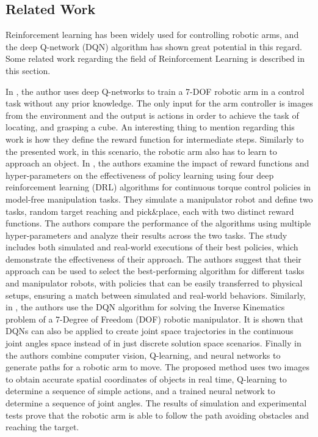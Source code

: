 \documentclass[12pt,oneside]{article}
\begin{document}
%
\subsection{Related Work}
Reinforcement learning has been widely used for controlling robotic arms, and the deep Q-network (DQN) algorithm has shown great potential in this regard. Some related work regarding the field of Reinforcement Learning is described in this section.

In \cite{james20163d}, the author uses deep Q-networks to train a 7-DOF robotic arm in
a control task without any prior knowledge. The only input for the arm controller is images from the environment and the output is actions in order to achieve the task of locating, and grasping a cube. An interesting thing to mention regarding this work is how they define the reward function for intermediate steps. Similarly to the presented work, in this scenario, the robotic arm also has to learn to approach an object. 
In \cite{franceschetti2022robotic}, the authors examine the impact of reward functions and hyper-parameters on the effectiveness of policy learning using four deep reinforcement learning (DRL) algorithms for continuous torque control policies in model-free manipulation tasks. They simulate a manipulator robot and define two tasks, random target reaching and pick\&place, each with two distinct reward functions. The authors compare the performance of the algorithms using multiple hyper-parameters and analyze their results across the two tasks. The study includes both simulated and real-world executions of their best policies, which demonstrate the effectiveness of their approach. The authors suggest that their approach can be used to select the best-performing algorithm for different tasks and manipulator robots, with policies that can be easily transferred to physical setups, ensuring a match between simulated and real-world behaviors.
Similarly,  in \cite{malik2022deep}, the authors use the DQN algorithm for solving the Inverse Kinematics problem of a 7-Degree of Freedom (DOF) robotic manipulator. It is shown that DQNs can also be applied to create joint space trajectories in the continuous joint angles space instead of in just discrete solution space scenarios.
Finally in \cite{abdi2022computer} the authors combine computer vision, Q-learning, and neural networks to generate paths for a robotic arm to move. The proposed method uses two images to obtain accurate spatial coordinates of objects in real time, Q-learning to determine a sequence of simple actions, and a trained neural network to determine a sequence of joint angles. The results of simulation and experimental tests prove that the robotic arm is able to follow the path avoiding obstacles and reaching the target.
\end{document}
